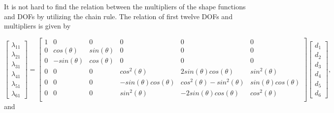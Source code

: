 \documentclass[11pt]{article}  %
\begin{document}
It is not hard to find the relation between the multipliers of the shape functions and DOFs by utilizing the chain rule. The relation of first twelve DOFs and multipliers is given by

\begin{equation} 
\left[
 \begin{array}{c}
 \lambda_{11} \\
 \lambda_{21} \\
 \lambda_{31} \\
 \lambda_{41}\\
 \lambda_{51}\\
 \lambda_{61}
 \end{array} \right]
=\left[
 \begin{array}{cccccc}
 1 & 0 & 0 & 0 & 0 & 0 \\
 0 & cos(\theta) & sin(\theta) & 0 & 0 &0 \\
 0 & -sin(\theta) & cos(\theta) & 0 & 0 &0 \\
 0 & 0 & 0 & cos^2(\theta) & 2sin(\theta)cos(\theta) & sin^2(\theta) \\
 0 & 0 & 0 & -sin(\theta)cos(\theta) & cos^2(\theta)-sin^2(\theta) & sin(\theta)cos(\theta) \\
 0 & 0 & 0 & sin^2(\theta) & -2sin(\theta)cos(\theta) & cos^2(\theta) \\ 
 \end{array}
 \right]
 \left[
 \begin{array}{c}
 d_{1} \\
 d_{2} \\
 d_{3} \\
 d_{4}\\
 d_{5}\\
 d_{6}
 \end{array} \right],
\end{equation}
and
\end{document}
